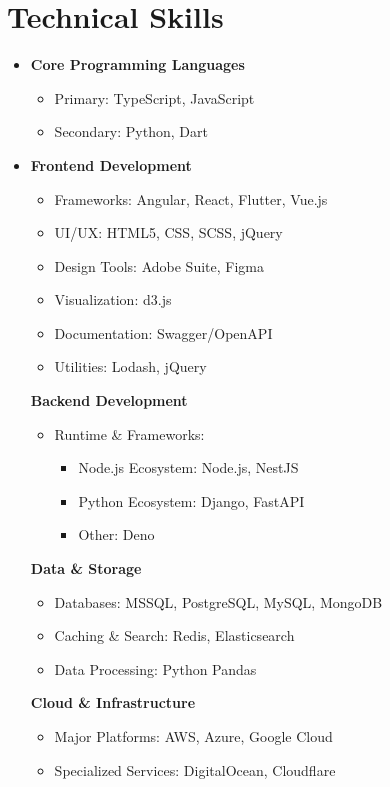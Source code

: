 \documentclass[letterpaper,10pt]{article}
\begin{document}
\clearpage
\section{Technical Skills}
\begin{itemize}[leftmargin=*, itemsep=0.1em, label={}]
	\item \textbf{Core Programming Languages}
	\begin{itemize}
		\item Primary: TypeScript, JavaScript
		\item Secondary: Python, Dart
	\end{itemize}
	
	\item \textbf{Frontend Development}
	\begin{itemize}
		\item Frameworks: Angular, React, Flutter, Vue.js
		\item UI/UX: HTML5, CSS, SCSS, jQuery
		\item Design Tools: Adobe Suite, Figma
		\item Visualization: d3.js
		\item Documentation: Swagger/OpenAPI
		\item Utilities: Lodash, jQuery
	\end{itemize}
	
	\textbf{Backend Development}
	\begin{itemize}
		\item Runtime \& Frameworks:
		\begin{itemize}[label=-, leftmargin=*, itemsep=0.1em]
			\item Node.js Ecosystem: Node.js, NestJS
			\item Python Ecosystem: Django, FastAPI
			\item Other: Deno
		\end{itemize}
	\end{itemize}
	
	\textbf{Data \& Storage}
	\begin{itemize}
		\item Databases: MSSQL, PostgreSQL, MySQL, MongoDB
		\item Caching \& Search: Redis, Elasticsearch
		\item Data Processing: Python Pandas
	\end{itemize}
	
	\textbf{Cloud \& Infrastructure}
	\begin{itemize}
		\item Major Platforms: AWS, Azure, Google Cloud
		\item Specialized Services: DigitalOcean, Cloudflare
	\end{itemize}
	

\end{itemize}
\end{document}
